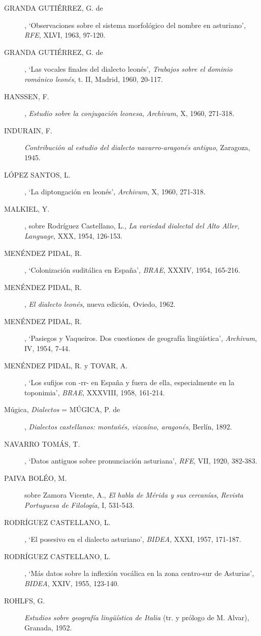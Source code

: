 \documentclass[11pt,spanish,b5paper]{book}
\begin{document}
\begin{description}
\item[GRANDA GUTIÉRREZ, G. de], `Observaciones sobre el sistema morfológico del nombre en asturiano', \textit{RFE}, XLVI, 1963, 97-120. 
\item[GRANDA GUTIÉRREZ, G. de], `Las vocales finales del dialecto leonés', \textit{Trabajos sobre el dominio románico leonés}, t. II, Madrid, 1960, 20-117.
\item[HANSSEN, F.], \textit{Estudio sobre  la conjugación leonesa}, \textit{Archivum}, X, 1960, 271-318.
\item[INDURAIN, F.] \textit{Contribución al estudio del dialecto navarro-aragonés antiguo}, Zaragoza, 1945.
\item[LÓPEZ SANTOS, L.], `La diptongación en leonés', \textit{Archivum}, X, 1960, 271-318.
\item[MALKIEL, Y.], sobre Rodríguez Castellano, L., \textit{La variedad dialectal del Alto Aller}, \textit{Language}, XXX, 1954, 126-153.
\item[MENÉNDEZ PIDAL, R.], `Colonización suditálica en España', \textit{BRAE}, XXXIV, 1954, 165-216.
\item[MENÉNDEZ PIDAL, R.], \textit{El dialecto leonés}, nueva edición, Oviedo, 1962.
\item[MENÉNDEZ PIDAL, R.], `Pasiegos y Vaqueiros. Dos cuestiones de geografía lingüística', \textit{Archivum}, IV, 1954, 7-44.
\item[MENÉNDEZ PIDAL, R. y TOVAR, A.],  `Los sufijos con -rr- en España y fuera de ella, especialmente en la toponimia', \textit{BRAE}, XXXVIII, 1958, 161-214. 
\item[Múgica, \textit{Dialectos} = MÚGICA, P. de], \textit{Dialectos castellanos: montañés, vizcaíno, aragonés}, Berlín, 1892.
\item[NAVARRO TOMÁS, T.], `Datos antiguos sobre pronunciación asturiana', \textit{RFE}, VII, 1920, 382-383.
\item[PAIVA BOLÉO, M.] sobre Zamora Vicente, A., \textit{El habla de Mérida y sus cercanías},  \textit{Revista Portuguesa de Filología}, I, 531-543. 
\item[RODRÍGUEZ CASTELLANO, L.], `El posesivo en el dialecto asturiano', \textit{BIDEA}, XXXI, 1957, 171-187.
\item[RODRÍGUEZ CASTELLANO, L.], `Más datos sobre la inflexión vocálica en la zona centro-sur de Asturias', \textit{BIDEA}, XXIV, 1955, 123-140.
\item[ROHLFS, G.] \textit{Estudios sobre geografía lingüística de Italia} (tr. y prólogo de M. Alvar), Granada, 1952.

\end{description}
\end{document}
